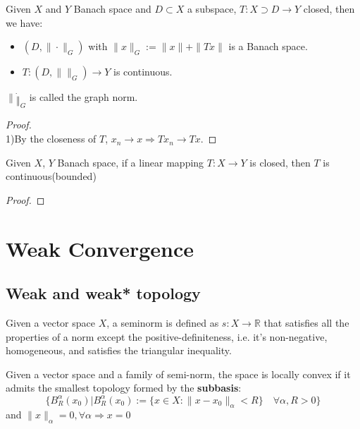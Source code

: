 \begin{lemma}
	Given $X$ and $Y$ Banach space and $D \subset X$ a subspace, $T: X \supset D \rightarrow Y$ closed, then we have:
	\begin{itemize}
		\item $(D, \| \cdot \|_G)$ with $\|x\|_G:= \|x\| + \|Tx\|$ is a Banach space.
		\item $T: (D, \|\|_G) \rightarrow Y$ is continuous.
	\end{itemize}
	$\|\dot\|_G$ is called the graph norm.
\end{lemma}
\begin{proof}
\quad\\
1)By the closeness of $T$, $x_n \rightarrow x \Rightarrow Tx_n \rightarrow Tx$. 
\end{proof}

\begin{theorem}
	Given $X$, $Y$ Banach space, if a linear mapping $T: X \rightarrow Y$ is closed, then $T$ is continuous(bounded)
\end{theorem}
\begin{proof}
\end{proof}



\newpage
\section{Weak Convergence}
\subsection{Weak and weak* topology}
\begin{definition}[seminorm]
	Given a vector space $X$, a seminorm is defined as $s: X \rightarrow \mathbb{R}$ that satisfies all the properties of a norm except the positive-definiteness, i.e. it's non-negative, homogeneous, and satisfies the triangular inequality.
\end{definition}

\begin{definition}
	Given a vector space and a family of semi-norm, the space is locally convex if it admits the smallest topology formed by the \textbf{subbasis}:
	\begin{equation*}
		\bigg\{B^\alpha_R(x_0)\bigg|B^\alpha_R(x_0):= \{ x \in X : \|x - x_0\|_\alpha < R \} \quad \forall \alpha, R>0 \bigg\}
	\end{equation*}
	and $\|x\|_\alpha = 0, \forall \alpha \Rightarrow x = 0$
\end{definition}


